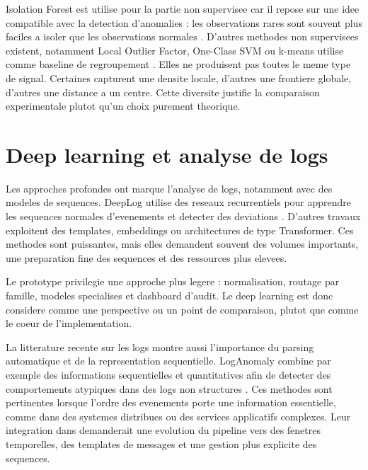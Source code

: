 Isolation Forest est utilise pour la partie non supervisee car il repose sur une idee compatible avec la detection d'anomalies : les observations rares sont souvent plus faciles a isoler que les observations normales \cite{liu2008isolation}. D'autres methodes non supervisees existent, notamment Local Outlier Factor, One-Class SVM ou k-means utilise comme baseline de regroupement \cite{breunig2000lof,scholkopf2001estimating,macqueen1967kmeans}. Elles ne produisent pas toutes le meme type de signal. Certaines capturent une densite locale, d'autres une frontiere globale, d'autres une distance a un centre. Cette diversite justifie la comparaison experimentale plutot qu'un choix purement theorique.

\section{Deep learning et analyse de logs}
Les approches profondes ont marque l'analyse de logs, notamment avec des modeles de sequences. DeepLog utilise des reseaux recurrentiels pour apprendre les sequences normales d'evenements et detecter des deviations \cite{du2017deeplog}. D'autres travaux exploitent des templates, embeddings ou architectures de type Transformer. Ces methodes sont puissantes, mais elles demandent souvent des volumes importants, une preparation fine des sequences et des ressources plus elevees.

Le prototype \logminer{} privilegie une approche plus legere : normalisation, routage par famille, modeles specialises et dashboard d'audit. Le deep learning est donc considere comme une perspective ou un point de comparaison, plutot que comme le coeur de l'implementation.

La litterature recente sur les logs montre aussi l'importance du parsing automatique et de la representation sequentielle. LogAnomaly combine par exemple des informations sequentielles et quantitatives afin de detecter des comportements atypiques dans des logs non structures \cite{meng2019loganomaly}. Ces methodes sont pertinentes lorsque l'ordre des evenements porte une information essentielle, comme dans des systemes distribues ou des services applicatifs complexes. Leur integration dans \logminer{} demanderait une evolution du pipeline vers des fenetres temporelles, des templates de messages et une gestion plus explicite des sequences.

